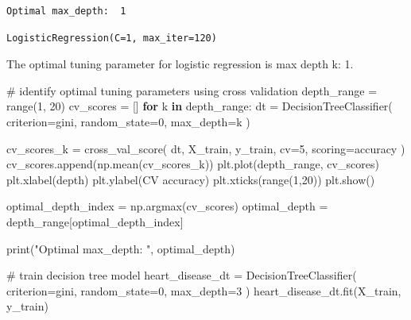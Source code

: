 \documentclass[
  11pt,
  letterpaper,
  DIV=11,
  numbers=noendperiod]{scrartcl}
\newenvironment{Shaded}{\begin{snugshade}}{\end{snugshade}}
\newcommand{\BuiltInTok}[1]{\textcolor[rgb]{0.00,0.23,0.31}{#1}}
\newcommand{\CommentTok}[1]{\textcolor[rgb]{0.37,0.37,0.37}{#1}}
\newcommand{\ControlFlowTok}[1]{\textcolor[rgb]{0.00,0.23,0.31}{\textbf{#1}}}
\newcommand{\DecValTok}[1]{\textcolor[rgb]{0.68,0.00,0.00}{#1}}
\newcommand{\KeywordTok}[1]{\textcolor[rgb]{0.00,0.23,0.31}{\textbf{#1}}}
\newcommand{\NormalTok}[1]{\textcolor[rgb]{0.00,0.23,0.31}{#1}}
\newcommand{\OperatorTok}[1]{\textcolor[rgb]{0.37,0.37,0.37}{#1}}
\newcommand{\StringTok}[1]{\textcolor[rgb]{0.13,0.47,0.30}{#1}}
\begin{document}
\begin{verbatim}
Optimal max_depth:  1
\end{verbatim}

\begin{verbatim}
LogisticRegression(C=1, max_iter=120)
\end{verbatim}

The optimal tuning parameter for logistic regression is max depth k: 1.

\begin{Shaded}
\begin{Highlighting}[]
\CommentTok{\# identify optimal tuning parameters using cross validation}
\NormalTok{depth\_range }\OperatorTok{=} \BuiltInTok{range}\NormalTok{(}\DecValTok{1}\NormalTok{, }\DecValTok{20}\NormalTok{)}
\NormalTok{cv\_scores }\OperatorTok{=}\NormalTok{ []}
\ControlFlowTok{for}\NormalTok{ k }\KeywordTok{in}\NormalTok{ depth\_range:}
\NormalTok{    dt }\OperatorTok{=}\NormalTok{ DecisionTreeClassifier(}
\NormalTok{    criterion}\OperatorTok{=}\StringTok{\textquotesingle{}gini\textquotesingle{}}\NormalTok{, }
\NormalTok{    random\_state}\OperatorTok{=}\DecValTok{0}\NormalTok{,}
\NormalTok{    max\_depth}\OperatorTok{=}\NormalTok{k}
\NormalTok{    )}

\NormalTok{    cv\_scores\_k }\OperatorTok{=}\NormalTok{ cross\_val\_score(}
\NormalTok{        dt,}
\NormalTok{        X\_train,}
\NormalTok{        y\_train,}
\NormalTok{        cv}\OperatorTok{=}\DecValTok{5}\NormalTok{,}
\NormalTok{        scoring}\OperatorTok{=}\StringTok{\textquotesingle{}accuracy\textquotesingle{}}
\NormalTok{    )}
\NormalTok{    cv\_scores.append(np.mean(cv\_scores\_k))}
\NormalTok{plt.plot(depth\_range, cv\_scores)}
\NormalTok{plt.xlabel(}\StringTok{\textquotesingle{}depth\textquotesingle{}}\NormalTok{)}
\NormalTok{plt.ylabel(}\StringTok{\textquotesingle{}CV accuracy\textquotesingle{}}\NormalTok{)}
\NormalTok{plt.xticks(}\BuiltInTok{range}\NormalTok{(}\DecValTok{1}\NormalTok{,}\DecValTok{20}\NormalTok{))}
\NormalTok{plt.show()}

\NormalTok{optimal\_depth\_index }\OperatorTok{=}\NormalTok{ np.argmax(cv\_scores)}
\NormalTok{optimal\_depth }\OperatorTok{=}\NormalTok{ depth\_range[optimal\_depth\_index]}

\BuiltInTok{print}\NormalTok{(}\StringTok{"Optimal max\_depth: "}\NormalTok{, optimal\_depth)}

\CommentTok{\# train decision tree model}
\NormalTok{heart\_disease\_dt }\OperatorTok{=}\NormalTok{ DecisionTreeClassifier(}
\NormalTok{    criterion}\OperatorTok{=}\StringTok{\textquotesingle{}gini\textquotesingle{}}\NormalTok{,}
\NormalTok{    random\_state}\OperatorTok{=}\DecValTok{0}\NormalTok{,}
\NormalTok{    max\_depth}\OperatorTok{=}\DecValTok{3}
\NormalTok{)}
\NormalTok{heart\_disease\_dt.fit(X\_train, y\_train)}
\end{Highlighting}
\end{Shaded}
\end{document}
